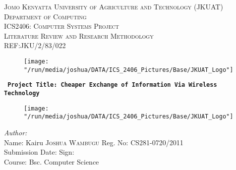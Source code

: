 \documentclass[12pt,svgnames,smaller]{article} %
\begin{document}
	\begin{titlepage}
		\begin{center}
			
			
			\textsc{\large Jomo Kenyatta University of Agriculture and Technology (JKUAT)}\\[0.4cm]
			\textsc{\large Department of Computing}\\[0.4cm]
			\textsc{\large ICS2406: Computer Systems Project  }\\[0.3cm]
			\textsc{\large Literature Review and Research Methodology }\\[0.3cm]
			\textsc{\large REF:JKU/2/83/022 }\\[0.2 cm]
			
			
			\begin{figure}
				\centering
				\texttt{[image: "/run/media/joshua/DATA/ICS\_2406\_Pictures/Base/JKUAT\_Logo"]}
				\label{fig:JKUAT_logo}
			\end{figure}
			\textbf{\texttt{ Project Title: Cheaper Exchange of Information Via Wireless Technology }}{\vspace*{20 mm}}
		\end{center}
		
		
		\begin{figure}
			\centering
			\texttt{[image: "/run/media/joshua/DATA/ICS\_2406\_Pictures/Base/JKUAT\_Logo"]}
			\label{fig:JKUAT_logo}
		\end{figure}
		
		
		\begin{minipage}{1.0\textwidth}	
			\begin{flushleft} \large
				\emph{Author:}\\
				Name: Kairu \textsc{Joshua Wambugu} Reg. No: CS281-0720/2011 \\
				Submission Date: \hrulefill  Sign: \hrulefill \\
				Course: Bsc. Computer Science
			\end{flushleft}
		\end{minipage}
		

\end{titlepage}
\end{document}
